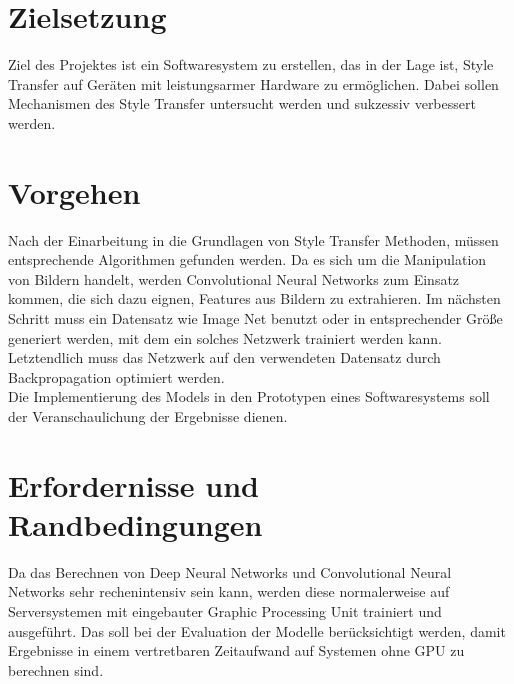 \section{Zielsetzung}
Ziel des Projektes ist ein Softwaresystem zu erstellen, das in der Lage ist,
Style Transfer auf Geräten mit leistungsarmer Hardware zu ermöglichen. Dabei sollen Mechanismen des Style Transfer
untersucht werden und sukzessiv verbessert werden.

\section{Vorgehen}
Nach der Einarbeitung in die Grundlagen von Style Transfer \cite{DBLP:journals/corr/GatysEB15a} \cite{DBLP:journals/corr/JohnsonAL16} Methoden,
müssen entsprechende Algorithmen gefunden werden. Da es sich um die Manipulation von Bildern handelt, werden Convolutional Neural Networks
\cite{lecun-gradientbased-learning-applied-1998} zum Einsatz kommen, die sich dazu eignen, Features aus Bildern zu extrahieren. 
Im nächsten Schritt muss ein Datensatz wie Image Net \cite{imagenet_cvpr09} benutzt oder in entsprechender Größe generiert werden, mit dem ein solches Netzwerk trainiert 
werden kann. Letztendlich muss das Netzwerk auf den verwendeten Datensatz durch Backpropagation \cite{doi:10.1162/neco.1989.1.4.541} optimiert werden.
\\
Die Implementierung des Models in den Prototypen eines Softwaresystems soll der Veranschaulichung der Ergebnisse dienen.

\pagebreak

\section{Erfordernisse und Randbedingungen}
Da das Berechnen von Deep Neural Networks und Convolutional Neural Networks sehr rechenintensiv sein kann,
werden diese normalerweise auf Serversystemen mit eingebauter Graphic Processing Unit trainiert und ausgeführt. Das soll bei der Evaluation der 
Modelle berücksichtigt werden, damit Ergebnisse in einem vertretbaren Zeitaufwand auf Systemen ohne GPU zu berechnen sind.

